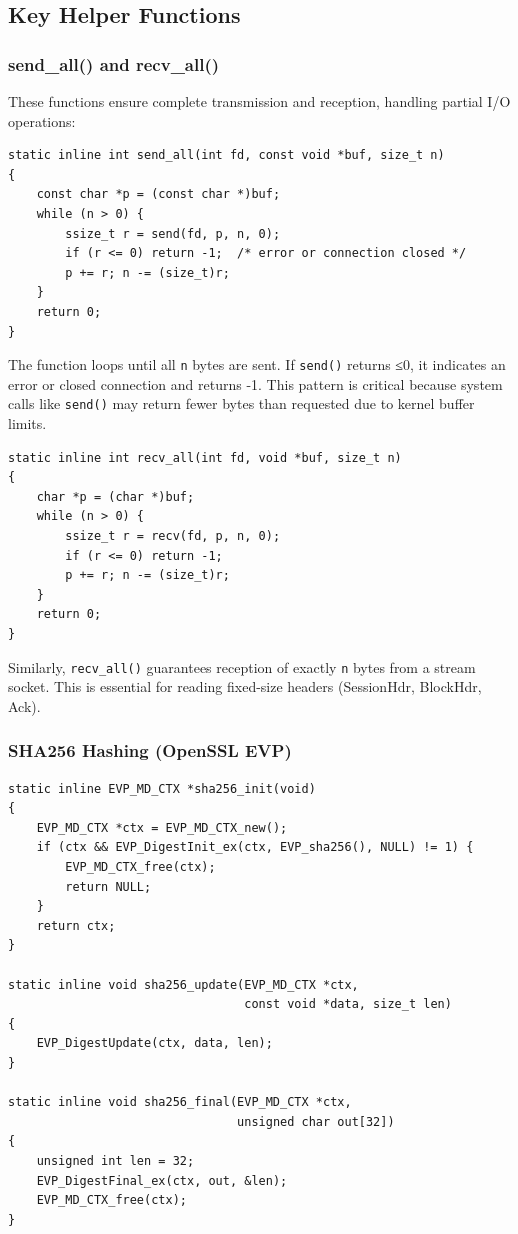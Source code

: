 \documentclass[12pt,a4paper]{article}
\begin{document}
\subsection{Key Helper Functions}

\subsubsection{send\_all() and recv\_all()}

These functions ensure complete transmission and reception, handling partial I/O operations:

\begin{lstlisting}[caption=send\_all: Ensure n bytes are sent,label=lst:sendall]
static inline int send_all(int fd, const void *buf, size_t n)
{
    const char *p = (const char *)buf;
    while (n > 0) {
        ssize_t r = send(fd, p, n, 0);
        if (r <= 0) return -1;  /* error or connection closed */
        p += r; n -= (size_t)r;
    }
    return 0;
}
\end{lstlisting}

The function loops until all \texttt{n} bytes are sent. If \texttt{send()} returns ≤0, it indicates an error or closed connection and returns -1. This pattern is critical because system calls like \texttt{send()} may return fewer bytes than requested due to kernel buffer limits.

\begin{lstlisting}[caption=recv\_all: Receive exactly n bytes,label=lst:recvall]
static inline int recv_all(int fd, void *buf, size_t n)
{
    char *p = (char *)buf;
    while (n > 0) {
        ssize_t r = recv(fd, p, n, 0);
        if (r <= 0) return -1;
        p += r; n -= (size_t)r;
    }
    return 0;
}
\end{lstlisting}

Similarly, \texttt{recv\_all()} guarantees reception of exactly \texttt{n} bytes from a stream socket. This is essential for reading fixed-size headers (SessionHdr, BlockHdr, Ack).

\subsubsection{SHA256 Hashing (OpenSSL EVP)}

\begin{lstlisting}[caption=SHA-256 Init and Update,label=lst:sha256]
static inline EVP_MD_CTX *sha256_init(void)
{
    EVP_MD_CTX *ctx = EVP_MD_CTX_new();
    if (ctx && EVP_DigestInit_ex(ctx, EVP_sha256(), NULL) != 1) {
        EVP_MD_CTX_free(ctx);
        return NULL;
    }
    return ctx;
}

static inline void sha256_update(EVP_MD_CTX *ctx, 
                                 const void *data, size_t len)
{
    EVP_DigestUpdate(ctx, data, len);
}

static inline void sha256_final(EVP_MD_CTX *ctx, 
                                unsigned char out[32])
{
    unsigned int len = 32;
    EVP_DigestFinal_ex(ctx, out, &len);
    EVP_MD_CTX_free(ctx);
}
\end{lstlisting}
\end{document}
